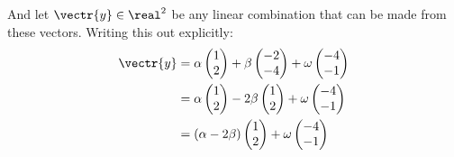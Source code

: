 And let $\vectr{y} \in \real^2$ be any linear combination that can be made from these vectors. Writing this out explicitly:
\begin{align}
	\vectr{y} &= \alpha \begin{pmatrix} 1 \\ 2 \end{pmatrix} + \beta \begin{pmatrix} -2 \\ -4 \end{pmatrix} + \omega \begin{pmatrix} -4 \\ -1 \end{pmatrix} \\
	&= \alpha \begin{pmatrix} 1 \\ 2 \end{pmatrix} - 2\beta \begin{pmatrix} 1 \\ 2 \end{pmatrix} + \omega \begin{pmatrix} -4 \\ -1 \end{pmatrix} \\
	&= (\alpha - 2\beta) \begin{pmatrix} 1 \\ 2 \end{pmatrix} + \omega \begin{pmatrix} -4 \\ -1 \end{pmatrix} \\
\end{align} 
